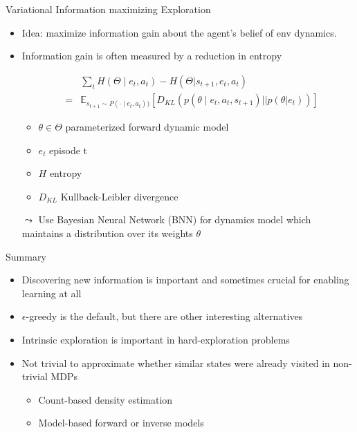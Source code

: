 \documentclass[aspectratio=169]{../latex_main/tntbeamer}  %
\begin{document}
\begin{frame}[c]{Variational Information maximizing Exploration }
	
	\begin{itemize}
		\item Idea: maximize information gain about the agent's belief of env dynamics.
		\item Information gain is often measured by a reduction in entropy
		
		\begin{eqnarray}
		&&\sum_t H(\Theta \mid e_t, a_t) - H(\Theta | s_{t+1}, e_t, a_t)\nonumber\\
		&=& \mathbb{E}_{s_{t+1}\sim P(\cdot\mid e_t, a_t))} \left[ D_{KL} (p(\theta \mid e_t, a_t, s_{t+1}) || p(\theta|e_t))  \right]\nonumber
		\end{eqnarray}
		
		\begin{itemize}
			\item $\theta \in \Theta$ parameterized forward dynamic model
			\item $e_t$ episode t
			\item $H$ entropy
			\item $D_{KL}$ Kullback-Leibler divergence
		\end{itemize}
	
		\item[$\leadsto$] Use Bayesian Neural Network (BNN) for dynamics model which maintains a distribution over its weights $\theta$
		
	\end{itemize}
	
\end{frame}

\begin{frame}[c]{Summary}
	
	\begin{itemize}
		\item Discovering new information is important and sometimes crucial for enabling learning at all
		\item $\epsilon$-greedy is the default, but there are other interesting alternatives
		\item Intrinsic exploration is important in hard-exploration problems
		\item Not trivial to approximate whether similar states were already visited in non-trivial MDPs
		\begin{itemize}
		    \item Count-based density estimation
		    \item Model-based forward or inverse models
		\end{itemize}
	\end{itemize}
	
\end{frame}
\end{document}
